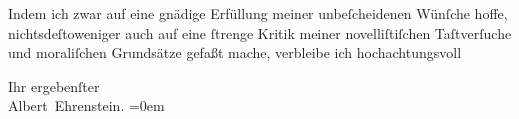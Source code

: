 \pstart
           Indem ich zwar auf eine gnädige Erfüllung meiner \introOben{}unbeſcheidenen\introOben{} Wünſche hoffe, nichtsdeſtoweniger auch auf eine{ }ſtrenge
               Kritik meiner novelliſtiſchen Taſtverſuche und moraliſchen Grundsätze gefaßt mache,
               verbleibe ich hochachtungsvoll\pend
           
\pstart
           Ihr ergebenſter{\\[\baselineskip]}\spacefill\mbox{Albert Ehrenstein.}\pend
           \leftskip=0em{}\endnumbering{}  \newcommand{\dateiname}{L01857}\newcommand{\titel}{Albert Ehrenstein an Arthur Schnitzler, 13. 7. 1909}\newcommand{\editorInnen}{Martin Anton Müller und Gerd-Hermann Susen}
